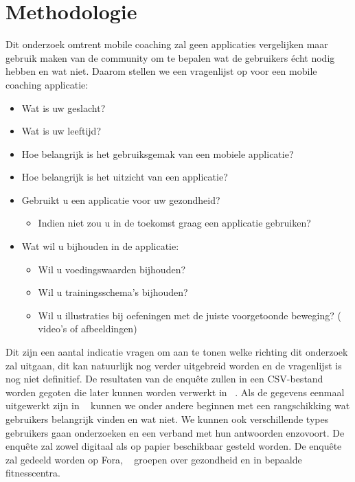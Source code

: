 


\section{Methodologie}
\label{sec:methodologie}
Dit onderzoek omtrent mobile coaching zal geen applicaties vergelijken maar gebruik maken van de community om te bepalen wat de gebruikers écht nodig hebben en wat niet. Daarom stellen we een vragenlijst op voor een mobile coaching applicatie: 
\begin{itemize}
\item Wat is uw geslacht?
\item Wat is uw leeftijd?
\item Hoe belangrijk is het gebruiksgemak van een mobiele applicatie?
\item Hoe belangrijk is het uitzicht van een applicatie?
\item Gebruikt u een applicatie voor uw gezondheid?
\begin{itemize}
\item Indien niet zou u in de toekomst graag een applicatie gebruiken?
\end{itemize}
\item Wat wil u bijhouden in de applicatie:
\begin{itemize}
\item Wil u voedingswaarden bijhouden?
\item Wil u trainingsschema's bijhouden?
\item Wil u illustraties bij oefeningen met de juiste voorgetoonde beweging? ( video's of afbeeldingen) 
\end{itemize}
\end{itemize}
Dit zijn een aantal indicatie vragen om aan te tonen welke richting dit onderzoek zal uitgaan, dit kan natuurlijk nog verder uitgebreid worden en de vragenlijst is nog niet definitief. De resultaten van de enquête zullen in een CSV-bestand worden gegoten die later kunnen worden verwerkt in ~\autocite{RStudio}.
 Als de gegevens eenmaal uitgewerkt zijn in ~\autocite{RStudio} kunnen we onder andere  beginnen met een rangschikking wat gebruikers belangrijk vinden en wat niet. We kunnen ook verschillende types gebruikers gaan onderzoeken en een verband met hun antwoorden enzovoort.\hfill \break \break
 De enquête zal zowel digitaal als op papier beschikbaar gesteld worden. De enquête zal gedeeld worden op Fora, ~\autocite{Facebook} groepen over gezondheid en in bepaalde fitnesscentra.

